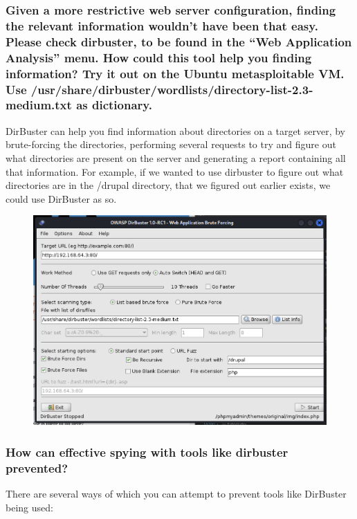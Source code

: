 \subsubsection{Given a more restrictive web server configuration, finding the relevant information wouldn't have been that easy. Please check dirbuster, to be found in the “Web Application Analysis” menu. How could this tool help you finding information? Try it out on the Ubuntu metasploitable VM. Use /usr/share/dirbuster/wordlists/directory-list-2.3-medium.txt as dictionary.}
DirBuster can help you find information about directories on a target server, by brute-forcing the directories, performing several requests to try and figure out what directories are present on the server and generating a report containing all that information. For example, if we wanted to use dirbuster to figure out what directories are in the /drupal directory, that we figured out earlier exists, we could use DirBuster as so.

\begin{figure}[H]
  \begin{center}
    \includegraphics[width=\textwidth]{Outputs/E05/dirbuster.png}
  \end{center}
\end{figure}


\subsubsection{How can effective spying with tools like dirbuster prevented?}
There are several ways of which you can attempt to prevent tools like DirBuster being used:

